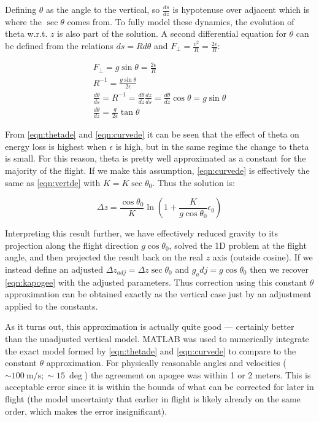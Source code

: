\documentclass{article}
\begin{document}
	Defining $\theta$ as the angle to the vertical, so $\frac{ds}{dz}$ is hypotenuse over adjacent which is where the $\sec\theta$ comes from.  To fully model these dynamics, the evolution of theta w.r.t. $z$ is also part of the solution.  A second differential equation for $\theta$ can be defined from the relations $ds=Rd\theta$ and $F_\perp=\frac{v^2}{R}=\frac{2\epsilon}{R}$:
	
	\begin{eqnarray}
		F_\perp = g\sin\theta = \frac{2\epsilon}{R} \\
		R^{-1} = \frac{g\sin\theta}{2\epsilon} \\
		\frac{d\theta}{ds} = R^{-1} = \frac{d\theta}{dz}\frac{dz}{ds} = \frac{d\theta}{dz}\cos\theta = g\sin\theta \\
		\label{eqn:thetade}\frac{d\theta}{dz} = \frac{g}{2\epsilon}\tan\theta
	\end{eqnarray}
	
	From \eqref{eqn:thetade} and \eqref{eqn:curvede} it can be seen that the effect of theta on energy loss is highest when $\epsilon$ is high, but in the same regime the change to theta is small.  For this reason, theta is pretty well approximated as a constant for the majority of the flight.  If we make this assumption, \eqref{eqn:curvede} is effectively the same as \eqref{eqn:vertde} with $K=K\sec\theta_0$.  Thus the solution is:
	
	\begin{equation}
		\Delta z = \frac{\cos\theta_0}{K} \ln\left(1 + \frac{K}{g\cos\theta_0}\epsilon_0\right)
	\end{equation}
	
	Interpreting this result further, we have effectively reduced gravity to its projection along the flight direction $g\cos\theta_0$, solved the 1D problem at the flight angle, and then projected the result back on the real $z$ axis (outside cosine).  If we instead define an adjusted $\Delta z_{adj} = \Delta z\sec\theta_0$ and $g_adj=g\cos\theta_0$ then we recover \eqref{eqn:kapogee} with the adjusted parameters.  Thus correction using this constant $\theta$ approximation can be obtained exactly as the vertical case just by an adjustment applied to the constants.
	
	As it turns out, this approximation is actually quite good --- certainly better than the unadjusted vertical model.  MATLAB was used to numerically integrate the exact model formed by \eqref{eqn:thetade} and \eqref{eqn:curvede} to compare to the constant $\theta$ approximation.  For physically reasonable angles and velocities ($\sim\!\SI{100}{\meter\per\second};\sim\!\SI{15}{\deg}$) the agreement on apogee was within 1 or 2 meters.  This is acceptable error since it is within the bounds of what can be corrected for later in flight (the model uncertainty that earlier in flight is likely already on the same order, which makes the error insignificant).
	
\end{document}

